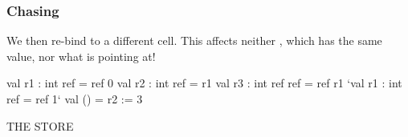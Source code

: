 \documentclass[aspectratio=169]{beamer}
\newcommand{\topthing}[2]{
      \begin{minipage}[t][#1][t]{\textwidth}
        \vspace{\fill}
        #2
        \vspace{\fill}
      \end{minipage}
    }
\begin{document}
\begin{frame}[fragile]
  \frametitle{ Chasing}

  \topthing{0.2in}{
    We then re-bind  to a different \code{ref} cell. This affects neither
    \code{r2}, which has the same value, nor what \code{r3} is pointing at!
  }

  \vspace{10pt}

  \begin{center}
    \begin{minipage}[t][2.1in][t]{0.6\textwidth}
      \vspace{\fill}
      \begin{codeblock}
        val r1 : int ref     = ref 0
        val r2 : int ref     = r1
        val r3 : int ref ref = ref r1
        `val r1 : int ref     = ref 1`
        val ()               = r2 := 3
      \end{codeblock}
      \vspace{\fill}
    \end{minipage}
    \hfill\vline\hfill
    \begin{minipage}[t][2.1in][t]{0.3\textwidth}
      \centering
      {\hspace{-20pt}\color{gray} \large THE STORE}

      \vspace{\fill}
      \vspace{\fill}
    \end{minipage}
  \end{center}
\end{frame}
\end{document}
